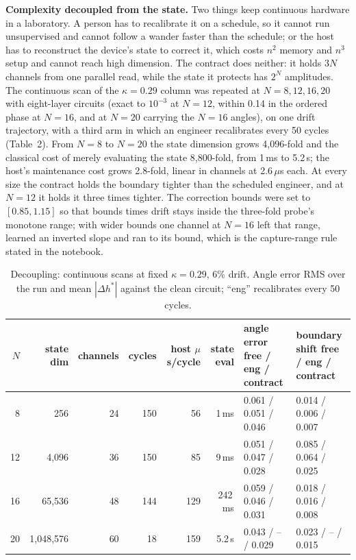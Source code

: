 \documentclass[10pt,letterpaper]{article}
\begin{document}
\textbf{Complexity decoupled from the state.} Two things keep continuous hardware in a laboratory. A person has to recalibrate it on a schedule, so it cannot run unsupervised and cannot follow a wander faster than the schedule; or the host has to reconstruct the device's state to correct it, which costs $n^2$ memory and $n^3$ setup and cannot reach high dimension. The contract does neither: it holds $3N$ channels from one parallel read, while the state it protects has $2^N$ amplitudes. The continuous scan of the $\kappa=0.29$ column was repeated at $N=8,12,16,20$ with eight-layer circuits (exact to $10^{-3}$ at $N=12$, within 0.14 in the ordered phase at $N=16$, and at $N=20$ carrying the $N=16$ angles), on one drift trajectory, with a third arm in which an engineer recalibrates every 50 cycles (Table~2). From $N=8$ to $N=20$ the state dimension grows 4,096-fold and the classical cost of merely evaluating the state 8,800-fold, from 1\,ms to 5.2\,s; the host's maintenance cost grows 2.8-fold, linear in channels at 2.6\,$\mu$s each. At every size the contract holds the boundary tighter than the scheduled engineer, and at $N=12$ it holds it three times tighter. The correction bounds were set to $[0.85,1.15]$ so that bounds times drift stays inside the three-fold probe's monotone range; with wider bounds one channel at $N=16$ left that range, learned an inverted slope and ran to its bound, which is the capture-range rule stated in the notebook.

\begin{table}[h]\caption{Decoupling: continuous scans at fixed $\kappa=0.29$, 6\% drift. Angle error RMS over the run and mean $|\Delta h^*|$ against the clean circuit; ``eng'' recalibrates every 50 cycles.}
\small\begin{tabularx}{\textwidth}{r r r r r r Y Y}\toprule
$N$ & state dim & channels & cycles & host $\mu$s/cycle & state eval & angle error free / eng / contract & boundary shift free / eng / contract\\ & 256 & 24 & 150 & 56 & 1\,ms & 0.061 / 0.051 / 0.046 & 0.014 / 0.006 / 0.007\\
12 & 4,096 & 36 & 150 & 85 & 9\,ms & 0.051 / 0.047 / 0.028 & 0.085 / 0.064 / 0.025\\
16 & 65,536 & 48 & 144 & 129 & 242\,ms & 0.059 / 0.046 / 0.031 & 0.018 / 0.016 / 0.008\\
20 & 1,048,576 & 60 & 18 & 159 & 5.2\,s & 0.043 / -- / 0.029 & 0.023 / -- / 0.015\\
\bottomrule\end{tabularx}\end{table}
\end{document}
